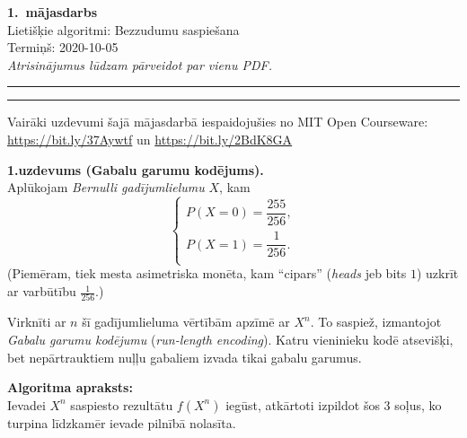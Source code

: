 \documentclass[a4paper,12pt]{article}
\begin{document}
\begin{center}
{\bf\Huge 1.\ mājasdarbs} \\[5pt]
Lietišķie algoritmi: Bezzudumu saspiešana \\
Termiņš: 2020-10-05\\[5pt]
{\em Atrisinājumus lūdzam pārveidot par vienu PDF.}
\end{center}

\hrule
\vspace{2pt}
\hrule
\vspace{12pt}



{\footnotesize
Vairāki uzdevumi šajā mājasdarbā iespaidojušies no MIT Open Courseware:
\url{https://bit.ly/37Aywtf} un \url{https://bit.ly/2BdK8GA}\\
}


\vspace{10pt}
{\bf 1.uzdevums (Gabalu garumu kodējums).}\\
Aplūkojam {\em Bernulli gadījumlielumu} $X$, kam
$$\left\{
\begin{array}{l}
P(X = 0) = \dfrac{255}{256},\\[6pt]
P(X = 1) = \dfrac{1}{256}.\\
\end{array} \right.$$
(Piemēram, tiek mesta asi\-met\-ris\-ka monēta, kam ``cipars''
({\em heads} jeb bits $1$) uzkrīt ar varbūtību $\frac{1}{256}$.)

Virknīti ar $n$ šī gadījumlieluma vērtībām ap\-zī\-mē ar $X^n$.
To saspiež, izmantojot {\em Gabalu garumu ko\-dē\-ju\-mu} ({\em run-length encoding}).
Katru vieninieku kodē atsevišķi, bet
nepārtrauktiem nuļļu gabaliem izvada tikai gabalu garumus.

{\bf Algoritma apraksts:}\\
Ievadei $X^n$ saspiesto rezultātu $f(X^n)$ iegūst,
atkārtoti izpildot šos 3 soļus, ko turpina līdzkamēr
ievade pilnībā nolasīta.
\end{document}
